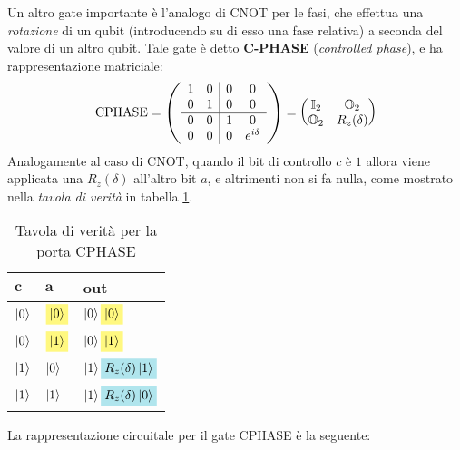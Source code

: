 \documentclass[../../InformazioneQuantistica.tex]{subfiles}
\begin{document}
Un altro gate importante è l'analogo di CNOT per le fasi, che effettua una \textit{rotazione} di un qubit (introducendo su di esso una fase relativa) a seconda  del valore di un altro qubit. Tale gate è detto \textbf{C-PHASE} (\textit{controlled phase}), e ha rappresentazione matriciale:
\begin{align*}
\operatorname{CPHASE} =
\left(
        \begin{array}{cc|cc}
        1 & 0 & 0 & 0 \\
        0 & 1 & 0 & 0 \\
        \hline
        0 & 0 & 1 & 0 \\
        0 & 0 & 0 & e^{i\delta} \\        
        \end{array}
\right)=
\begin{pmatrix}
\mathbb{I}_2 & \mathbb{O}_2\\
\mathbb{O}_2 & R_z(\delta)
\end{pmatrix}
\end{align*}
Analogamente al caso di CNOT, quando il bit di controllo $c$ è $1$ allora viene applicata una $R_z(\delta)$ all'altro bit $a$, e altrimenti non si fa nulla, come mostrato nella \textit{tavola di verità} in tabella \ref{tab:C-PHASE}.

\begin{table}[H]
\centering
\begin{tabular}{@{}lll@{}}
\toprule
$\bm{c}$ & $\bm{a}$ & \textbf{out} \\ \midrule
$\Ket{0}$ & $\hlc{Yellow}{\ket{0}}$ & $\ket{0}\hlc{Yellow}{\ket{0}}$ \\
$\Ket{0}$ & $\hlc{Yellow}{\ket{1}}$ & $\ket{0}\hlc{Yellow}{\ket{1}}$ \\
$\Ket{1}$ & $\Ket{0}$ & $\ket{1}\hlc{SkyBlue}{R_z(\delta)\ket{1}}$ \\
$\Ket{1}$ & $\Ket{1}$ & $\ket{1}\hlc{SkyBlue}{R_z(\delta)\ket{0}}$ \\ \bottomrule
\end{tabular}
\caption{Tavola di verità per la porta CPHASE}
\label{tab:C-PHASE}
\end{table}

La rappresentazione circuitale per il gate CPHASE è la seguente:

\end{document}

